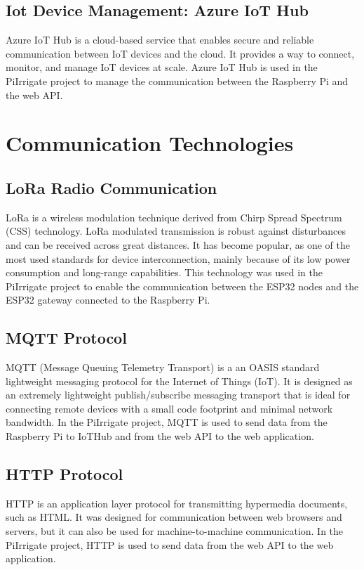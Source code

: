 \subsection{Iot Device Management: Azure IoT Hub}
Azure IoT Hub is a cloud-based service that enables secure and reliable 
communication between IoT devices and the cloud.
It provides a way to connect, monitor, and manage IoT devices at scale.
Azure IoT Hub is used in the PiIrrigate project to manage the
communication between the Raspberry Pi and the web API.

\section{Communication Technologies}
\subsection{LoRa Radio Communication}
LoRa is a wireless modulation technique derived from Chirp Spread Spectrum (CSS) technology.
LoRa modulated transmission is robust against disturbances and can be received across great distances.
It has become popular, as one of the most used standards for device interconnection, mainly because of its
low power consumption and long-range capabilities\cite{lora}. This technology was used in the PiIrrigate project
to enable the communication between the ESP32 nodes and the ESP32 gateway connected to the Raspberry Pi.

\subsection{MQTT Protocol}
MQTT (Message Queuing Telemetry Transport) is a 
an OASIS standard lightweight messaging protocol for the Internet of Things (IoT).
It is designed as an extremely lightweight publish/subscribe messaging transport that is ideal for connecting 
remote devices with a small code footprint and minimal network bandwidth. 
In the PiIrrigate project, MQTT is used to send data from the Raspberry Pi to IoTHub
and from the web API to the web application.

\subsection{HTTP Protocol}
HTTP is an application layer protocol for transmitting hypermedia documents, such as HTML.
It was designed for communication between web browsers and servers, 
but it can also be used for machine-to-machine communication.
In the PiIrrigate project, HTTP is used to send data from the web API to the web application\cite{http}.


